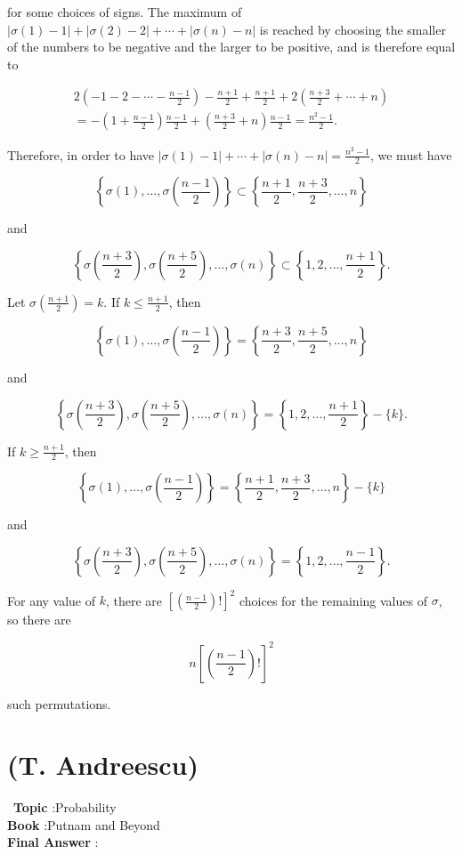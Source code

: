 \documentclass[10pt]{article}
\begin{document}
for some choices of signs. The maximum of $|\sigma(1)-1|+|\sigma(2)-2|+\cdots+|\sigma(n)-n|$ is reached by choosing the smaller of the numbers to be negative and the larger to be positive, and is therefore equal to

$$
\begin{gathered}
2\left(-1-2-\cdots-\frac{n-1}{2}\right)-\frac{n+1}{2}+\frac{n+1}{2}+2\left(\frac{n+3}{2}+\cdots+n\right) \\
=-\left(1+\frac{n-1}{2}\right) \frac{n-1}{2}+\left(\frac{n+3}{2}+n\right) \frac{n-1}{2}=\frac{n^{2}-1}{2} .
\end{gathered}
$$

Therefore, in order to have $|\sigma(1)-1|+\cdots+|\sigma(n)-n|=\frac{n^{2}-1}{2}$, we must have

$$
\left\{\sigma(1), \ldots, \sigma\left(\frac{n-1}{2}\right)\right\} \subset\left\{\frac{n+1}{2}, \frac{n+3}{2}, \ldots, n\right\}
$$

and 

$$
\left\{\sigma\left(\frac{n+3}{2}\right), \sigma\left(\frac{n+5}{2}\right), \ldots, \sigma(n)\right\} \subset\left\{1,2, \ldots, \frac{n+1}{2}\right\} .
$$

Let $\sigma\left(\frac{n+1}{2}\right)=k$. If $k \leq \frac{n+1}{2}$, then

$$
\left\{\sigma(1), \ldots, \sigma\left(\frac{n-1}{2}\right)\right\}=\left\{\frac{n+3}{2}, \frac{n+5}{2}, \ldots, n\right\}
$$

and

$$
\left\{\sigma\left(\frac{n+3}{2}\right), \sigma\left(\frac{n+5}{2}\right), \ldots, \sigma(n)\right\}=\left\{1,2, \ldots, \frac{n+1}{2}\right\}-\{k\} .
$$

If $k \geq \frac{n+1}{2}$, then

$$
\left\{\sigma(1), \ldots, \sigma\left(\frac{n-1}{2}\right)\right\}=\left\{\frac{n+1}{2}, \frac{n+3}{2}, \ldots, n\right\}-\{k\}
$$

and

$$
\left\{\sigma\left(\frac{n+3}{2}\right), \sigma\left(\frac{n+5}{2}\right), \ldots, \sigma(n)\right\}=\left\{1,2, \ldots, \frac{n-1}{2}\right\} .
$$

For any value of $k$, there are $\left[\left(\frac{n-1}{2}\right) !\right]^{2}$ choices for the remaining values of $\sigma$, so there are

$$
n\left[\left(\frac{n-1}{2}\right) !\right]^{2}
$$

such permutations.

\section{(T. Andreescu)}\
\textbf{Topic} :Probability\\
\textbf{Book} :Putnam and Beyond\\
\textbf{Final Answer} :\\
\end{document}
